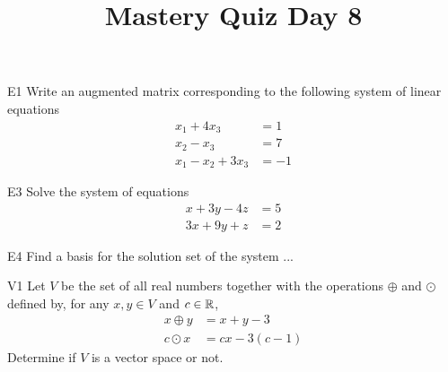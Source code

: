 \documentclass{sbgLAquiz}
\title{Mastery Quiz Day 8 }
\begin{document}
\begin{problem}{E1}
Write an augmented matrix corresponding to the following system of linear equations
\begin{align*}
x_1+4x_3 &= 1 \\
x_2-x_3 &= 7 \\
x_1-x_2+3x_3 &= -1
\end{align*}
\end{problem}
\begin{problem}{E3}
Solve the system of equations
\begin{align*}
x+3y-4z &= 5 \\
3x+9y+z &= 2
\end{align*}
\end{problem}

\begin{extract}\newpage\end{extract}
\begin{problem}{E4}
Find a basis for the solution set of the system ...
\end{problem}
\begin{problem}{V1}
Let $V$ be the  set of all real numbers together with the operations $\oplus$ and $\odot$ defined by, for any $x,y \in V$ and $c \in \mathbb{R}$,
\begin{align*}
x\oplus y  &= x+y-3 \\
c \odot x &= cx-3(c-1)
\end{align*}
Determine if $V$ is a vector space or not.
\end{problem}
\end{document}
